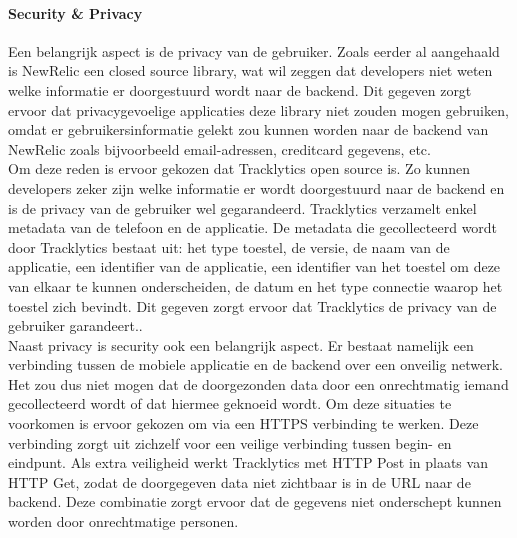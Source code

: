 \paragraph{Security \& Privacy}
Een belangrijk aspect is de privacy van de gebruiker. Zoals eerder al aangehaald is NewRelic een closed source library, wat wil zeggen dat developers niet weten welke informatie er doorgestuurd wordt naar de backend. Dit gegeven zorgt ervoor dat privacygevoelige applicaties deze library niet zouden mogen gebruiken, omdat er gebruikersinformatie gelekt zou kunnen worden naar de backend van NewRelic zoals bijvoorbeeld email-adressen, creditcard gegevens, etc.\\
Om deze reden is ervoor gekozen dat Tracklytics open source is. Zo kunnen developers zeker zijn welke informatie er wordt doorgestuurd naar de backend en is de privacy van de gebruiker wel gegarandeerd. Tracklytics verzamelt enkel metadata van de telefoon en de applicatie. De metadata die gecollecteerd wordt door Tracklytics bestaat uit: het type toestel, de versie, de naam van de applicatie, een identifier van de applicatie, een identifier van het toestel om deze van elkaar te kunnen onderscheiden, de datum en het type connectie waarop het toestel zich bevindt. Dit gegeven zorgt ervoor dat Tracklytics de privacy van de gebruiker garandeert..\\

Naast privacy is security ook een belangrijk aspect. Er bestaat namelijk een verbinding tussen de mobiele applicatie en de backend over een onveilig netwerk. Het zou dus niet mogen dat de doorgezonden data door een onrechtmatig iemand gecollecteerd wordt of dat hiermee geknoeid wordt. Om deze situaties te voorkomen is ervoor gekozen om via een HTTPS verbinding te werken. Deze verbinding zorgt uit zichzelf voor een veilige verbinding tussen begin- en eindpunt. Als extra veiligheid werkt Tracklytics met HTTP Post in plaats van HTTP Get, zodat de doorgegeven data niet zichtbaar is in de URL naar de backend. Deze combinatie zorgt ervoor dat de gegevens niet onderschept kunnen worden door onrechtmatige personen. 




